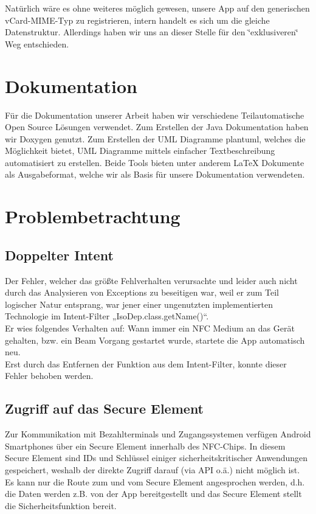 \documentclass[a4paper,ngerman,12pt]{scrreprt}
\newcommand{\+}{\discretionary{\mbox{\scriptsize$\hookleftarrow$}}{}{}}
\begin{document}
Natürlich wäre es ohne weiteres möglich gewesen, unsere App auf den generischen v\+Card-\/\+M\+I\+M\+E-\/\+Typ zu registrieren, intern handelt es sich um die gleiche Datenstruktur. Allerdings haben wir uns an dieser Stelle für den \char`\"{}exklusiveren\char`\"{} Weg entschieden.

\section{Dokumentation}

Für die Dokumentation unserer Arbeit haben wir verschiedene Teilautomatische Open Source Lösungen verwendet. Zum Erstellen der Java Dokumentation haben wir Doxygen genutzt. Zum Erstellen der UML Diagramme plantuml, welches die Möglichkeit bietet, UML Diagramme mittels einfacher Textbeschreibung automatisiert zu erstellen. Beide Tools bieten unter anderem La\+TeX Dokumente als Ausgabeformat, welche wir als Basis für unsere Dokumentation verwendeten.

\section{Problembetrachtung}

\subsection*{Doppelter Intent}

Der Fehler, welcher das größte Fehlverhalten verursachte und leider auch nicht durch das Analysieren von Exceptions zu beseitigen war, weil er zum Teil logischer Natur entsprang, war jener einer ungenutzten implementierten Technologie im Intent-\/\+Filter „\+Iso\+Dep.\+class.\+get\+Name()“. \\
Er wies folgendes Verhalten auf\+: Wann immer ein N\+FC Medium an das Gerät gehalten, bzw. ein Beam Vorgang gestartet wurde, startete die App automatisch neu. \\
Erst durch das Entfernen der Funktion aus dem Intent-\/\+Filter, konnte dieser Fehler behoben werden.

\subsection*{Zugriff auf das Secure Element}

Zur Kommunikation mit Bezahlterminals und Zugangssystemen verfügen Android Smartphones über ein Secure Element innerhalb des N\+F\+C-\/\+Chips. In diesem Secure Element sind I\+Ds und Schlüssel einiger sicherheitskritischer Anwendungen gespeichert, weshalb der direkte Zugriff darauf (via A\+PI o.\+ä.) nicht möglich ist. \\
Es kann nur die Route zum und vom Secure Element angesprochen werden, d.\+h. die Daten werden z.\+B. von der App bereitgestellt und das Secure Element stellt die Sicherheitsfunktion bereit.
\end{document}
